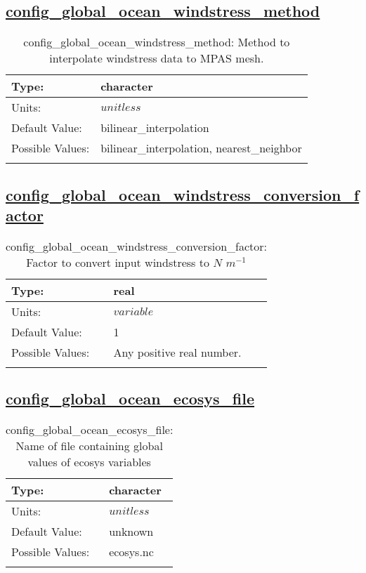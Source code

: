 \subsection[config\_global\_ocean\_windstress\_method]{\hyperref[sec:nm_tab_global_ocean]{config\_global\_ocean\_windstress\_method}}
\label{subsec:nm_sec_config_global_ocean_windstress_method}
\begin{center}
\begin{longtable}{| p{2.0in} || p{4.0in} |}
    \hline
    Type: & character \\
    \hline
    Units: & $unitless$ \\
    \hline
    Default Value: & bilinear\_interpolation \\
    \hline
    Possible Values: & bilinear\_interpolation, nearest\_neighbor \\
    \hline
    \caption{config\_global\_ocean\_windstress\_method: Method to interpolate windstress data to MPAS mesh.}
\end{longtable}
\end{center}
\subsection[config\_global\_ocean\_windstress\_conversion\_factor]{\hyperref[sec:nm_tab_global_ocean]{config\_global\_ocean\_windstress\_conversion\_factor}}
\label{subsec:nm_sec_config_global_ocean_windstress_conversion_factor}
\begin{center}
\begin{longtable}{| p{2.0in} || p{4.0in} |}
    \hline
    Type: & real \\
    \hline
    Units: & $variable$ \\
    \hline
    Default Value: & 1 \\
    \hline
    Possible Values: & Any positive real number. \\
    \hline
    \caption{config\_global\_ocean\_windstress\_conversion\_factor:  Factor to convert input windstress to  $N$   $m^{-1}$ }
\end{longtable}
\end{center}
\subsection[config\_global\_ocean\_ecosys\_file]{\hyperref[sec:nm_tab_global_ocean]{config\_global\_ocean\_ecosys\_file}}
\label{subsec:nm_sec_config_global_ocean_ecosys_file}
\begin{center}
\begin{longtable}{| p{2.0in} || p{4.0in} |}
    \hline
    Type: & character \\
    \hline
    Units: & $unitless$ \\
    \hline
    Default Value: & unknown \\
    \hline
    Possible Values: & ecosys.nc \\
    \hline
    \caption{config\_global\_ocean\_ecosys\_file: Name of file containing global values of ecosys variables}
\end{longtable}
\end{center}
